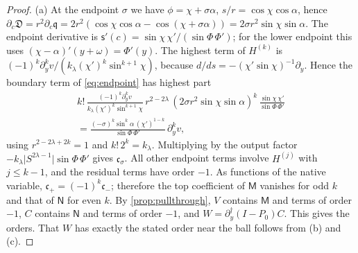 \documentclass[11pt]{amsart}
\numberwithin{equation}{section}
\theoremstyle{definition}
\theoremstyle{remark}
\newcommand{\abs}[1]{\lvert #1\rvert}
\newcommand{\Disc}{\mathfrak D}
\begin{document}
\begin{proof}
(a) At the endpoint $\sigma$ we have $\phi=\chi+\sigma\alpha$, $s/r=\cos\chi\cos\alpha$, hence $\partial_c\Disc=r^2\partial_c\mathfrak q=2r^2(\cos\chi\cos\alpha-\cos(\chi+\sigma\alpha))=2\sigma r^2\sin\chi\sin\alpha$. The endpoint derivative is $\mathsf s'(c)=\sin\chi\,\chi'/(\sin\Phi\,\Phi')$; for the lower endpoint this uses $(\chi-\alpha)'(y+\omega)=\Phi'(y)$. The highest term of $H^{(k)}$ is $(-1)^k\partial_y^kv/(k_\lambda(\chi')^k\sin^{k+1}\chi)$, because $d/ds=-(\chi'\sin\chi)^{-1}\partial_y$. Hence the boundary term of \eqref{eq:endpoint} has highest part
\begin{multline*}
k!\,\frac{(-1)^k\partial_y^kv}{k_\lambda(\chi')^k\sin^{k+1}\chi}\,r^{2-2\lambda}\,(2\sigma r^2\sin\chi\sin\alpha)^k\,\frac{\sin\chi\,\chi'}{\sin\Phi\,\Phi'}\\
=\frac{(-\sigma)^k\sin^k\alpha\,(\chi')^{1-k}}{\sin\Phi\,\Phi'}\,\partial_y^kv,
\end{multline*}
using $r^{2-2\lambda+2k}=1$ and $k!\,2^k=k_\lambda$. Multiplying by the output factor $-k_\lambda\abs{S^{2\lambda-1}}\sin\Phi\,\Phi'$ gives $\mathfrak c_\sigma$. All other endpoint terms involve $H^{(j)}$ with $j\le k-1$, and the residual terms have order $-1$. As functions of the native variable, $\mathfrak c_+=(-1)^k\mathfrak c_-$; therefore the top coefficient of $\mathsf M$ vanishes for odd $k$ and that of $\mathsf N$ for even $k$. By \cref{prop:pullthrough}, $V$ contains $\mathsf M$ and terms of order $-1$, $C$ contains $\mathsf N$ and terms of order $-1$, and $W=\partial_y^\dagger(I-P_0)C$. This gives the orders. That $W$ has exactly the stated order near the ball follows from (b) and (c).


\end{proof}
\end{document}
